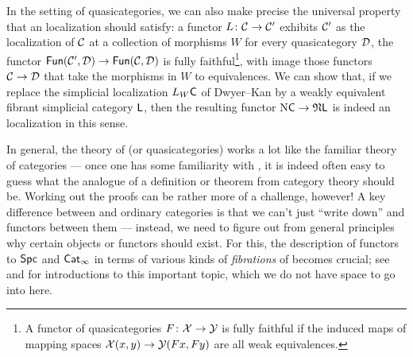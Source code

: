 \documentclass[a4paper,11pt]{article}
\begin{document}
\begin{remark}
  In the setting of quasicategories, we can also make precise the
  universal property that an \icatl{} localization should satisfy: a
  functor $L \colon \eC \to \eC'$ exhibits $\mathcal{C}'$ as the localization
  of $\mathcal{C}$ at a collection of morphisms $W$ \IFF{} for every
  quasicategory $\mathcal{D}$, the functor
  $\Fun(\eC', \eD) \to \Fun(\eC, \eD)$ is fully faithful\footnote{A
    functor of quasicategories $F \colon \eX \to \eY$ is fully
    faithful if the induced maps of mapping spaces
    $\eX(x,y) \to \eY(Fx,Fy)$ are all weak equivalences.}, with image
  those functors $\eC \to \eD$ that take the morphisms in $W$ to
  equivalences. We can show that, if we replace the simplicial
  localization $L_{W}\textup{\textsf{C}}$ of Dwyer--Kan by a weakly equivalent fibrant
  simplicial category $\textup{\textsf{L}}$, then the resulting functor
  $\Nrv \uC \to \Ncoh \uL$ is indeed an \icatl{} localization in this
  sense.
\end{remark}

\begin{remark}
  In general, the theory of \icats{} (or quasicategories) works a lot
  like the familiar theory of categories --- once one has some
  familiarity with \icats{}, it is indeed often easy to guess what the
  \icatl{} analogue of a definition or theorem from category theory
  should be. Working out the proofs can be rather more of a challenge,
  however! A key difference between \icats{} and ordinary categories
  is that we can't just ``write down'' \icats{} and functors between
  them --- instead, we need to figure out from general principles why
  certain objects or functors should exist. For this, the description
  of functors to $\textup{\textsf{Spc}}$ and $\textup{\textsf{Cat}}_\infty$ in terms of various kinds of
  \emph{fibrations} of \icats{} becomes crucial; see \cite{BarwickShah}
  and \cite{MazelGee}
  for introductions to this important topic,
  which we do not have space to go into here.
\end{remark}
\end{document}
